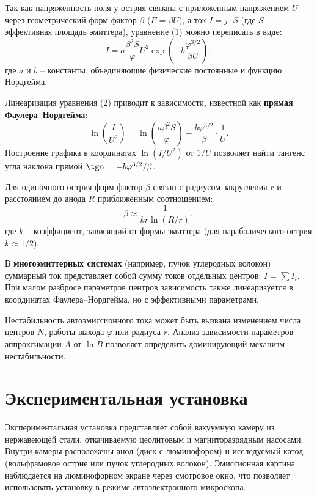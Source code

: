 \documentclass[a4paper]{article}
\begin{document}
Так как напряженность поля у острия связана с приложенным напряжением $U$ через геометрический форм-фактор $\beta$ ($E = \beta U$), а ток $I = j \cdot S$ (где $S$ -- эффективная площадь эмиттера), уравнение (1) можно переписать в виде:
\begin{equation}
    I = a \frac{\beta^2 S}{\varphi} U^2 \exp\left(-b \frac{\varphi^{3/2}}{\beta U}\right), \tag{2}
\end{equation}
где $a$ и $b$ -- константы, объединяющие физические постоянные и функцию Нордгейма.

Линеаризация уравнения (2) приводит к зависимости, известной как \textbf{прямая Фаулера--Нордгейма}:
\begin{equation}
    \ln\left(\frac{I}{U^2}\right) = \ln\left(\frac{a \beta^2 S}{\varphi}\right) - \frac{b \varphi^{3/2}}{\beta} \cdot \frac{1}{U}. \tag{3}
\end{equation}
Построение графика в координатах $\ln(I/U^2)$ от $1/U$ позволяет найти тангенс угла наклона прямой $\tg \alpha = -b \varphi^{3/2} / \beta$.

Для одиночного острия форм-фактор $\beta$ связан с радиусом закругления $r$ и расстоянием до анода $R$ приближенным соотношением:
\begin{equation}
    \beta \approx \frac{1}{k r \ln(R/r)}, \tag{4}
\end{equation}
где $k$ -- коэффициент, зависящий от формы эмиттера (для параболического острия $k \approx 1/2$).

В \textbf{многоэмиттерных системах} (например, пучок углеродных волокон) суммарный ток представляет собой сумму токов отдельных центров: $I = \sum I_i$. При малом разбросе параметров центров зависимость также линеаризуется в координатах Фаулера--Нордгейма, но с эффективными параметрами.

Нестабильность автоэмиссионного тока может быть вызвана изменением числа центров $N$, работы выхода $\varphi$ или радиуса $r$. Анализ зависимости параметров аппроксимации $\tilde{A}$ от $\ln \tilde{B}$ позволяет определить доминирующий механизм нестабильности.

\section{Экспериментальная установка}
Экспериментальная установка представляет собой вакуумную камеру из нержавеющей стали, откачиваемую цеолитовым и магниторазрядным насосами. Внутри камеры расположены анод (диск с люминофором) и исследуемый катод (вольфрамовое острие или пучок углеродных волокон). Эмиссионная картина наблюдается на люминофорном экране через смотровое окно, что позволяет использовать установку в режиме автоэлектронного микроскопа.
\end{document}
